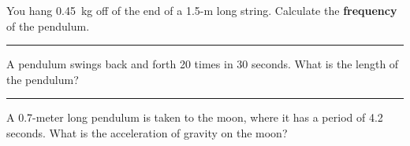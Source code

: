 \documentclass[12pt]{exam}
\begin{document}
\Large

\def\mystrut{\protect\rule[-2.2ex]{0ex}{2.2ex}} 
\qformat{ \textbf{Task \#\thequestion}
  \mystrut  \hfill}


\begin{questions}


\question
  You hang 0.45~kg off of the end of a 1.5-m long string.  Calculate the {\bf frequency} of the pendulum.

\vs \hrule \vs

\question
  A pendulum swings back and forth 20 times in 30 seconds.  What is the length of the pendulum? 


\vs \hrule \vs


\question
  A 0.7-meter long pendulum is taken to the moon, where it has a period of 4.2 seconds.  What is the acceleration of gravity on the moon?
  \vs 




\end{questions}
\end{document}
